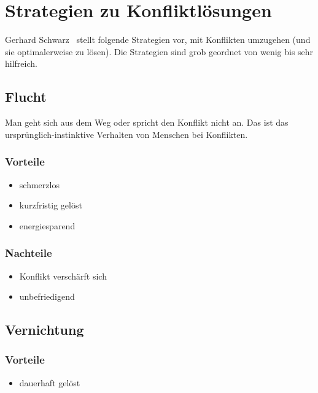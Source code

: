 \section{Strategien zu Konfliktlösungen}
\label{konfliktloesungs-strategien}

Gerhard Schwarz~\cite{schwarz-konfliktmanagement} stellt folgende Strategien vor, mit Konflikten umzugehen (und sie optimalerweise zu lösen). Die Strategien sind grob geordnet von \glqq wenig bis sehr hilfreich\grqq.

\subsection{Flucht}

Man geht sich aus dem Weg oder spricht den Konflikt nicht an. Das ist das ursprünglich-instinktive Verhalten von Menschen bei Konflikten.

\subsubsection{Vorteile}
\begin{itemize}
  \item schmerzlos
  \item kurzfristig gelöst
  \item energiesparend
\end{itemize}

\subsubsection{Nachteile}
\begin{itemize}
  \item Konflikt verschärft sich
  \item unbefriedigend
\end{itemize}


\subsection{Vernichtung}

\subsubsection{Vorteile}
\begin{itemize}
  \item dauerhaft gelöst
\end{itemize}


